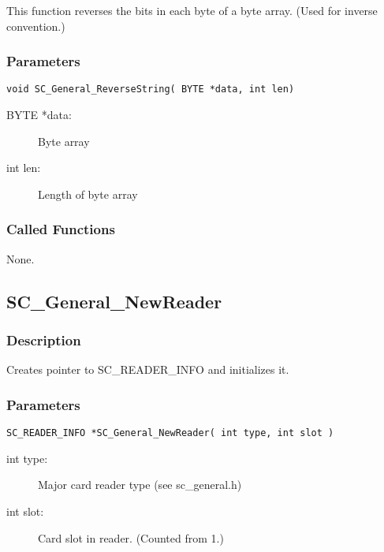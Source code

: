 \documentclass[a4paper,oneside]{article}
\begin{document}
This function reverses the bits in each byte of a byte array.
(Used for inverse convention.)

\subsubsection*{Parameters}

\begin{verbatim}
void SC_General_ReverseString( BYTE *data, int len)
\end{verbatim}

\begin{description}
\item[BYTE *data:] Byte array
\item[int len:] Length of byte array
\end{description}

\subsubsection*{Called Functions}

None.


\subsection{SC\_General\_NewReader}

\subsubsection*{Description}

Creates pointer to SC\_READER\_INFO and initializes it.

\subsubsection*{Parameters}

\begin{verbatim}
SC_READER_INFO *SC_General_NewReader( int type, int slot )
\end{verbatim}

\begin{description}
\item[int type:] Major card reader type (see sc\_general.h)
\item[int slot:] Card slot in reader. (Counted from 1.)
\end{description}
\end{document}
